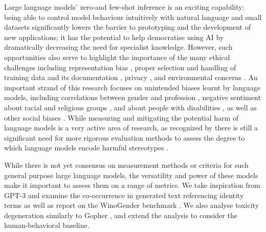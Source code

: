 Large language models' zero-and few-shot inference is an exciting capability: being able to control model behaviour intuitively with natural language and small datasets significantly lowers the barrier to prototyping and the development of new applications; it has the potential to help democratise using AI by dramatically decreasing the need for specialist knowledge. However, such opportunities also serve to highlight the importance of the many ethical challenges \cite{leidner-plachouras-2017-ethical,bender2021on,bommasani2021opportunities} including representation bias \cite{blodgett-etal-2020-language}, proper selection and handling of training data \cite{rogers-2021-changing} and its documentation \cite{bender-friedman-2018-data}, privacy \cite{privacy2016,carlini2021extracting}, and environmental concerns \cite{strubell-etal-2019-energy,patterson2021carbon}. An important strand of this research focuses on unintended biases learnt by language models, including correlations between gender and profession \citep{bolukbasi2016man,rudinger2018gender,zhao-etal-2018-gender}, negative sentiment about racial and religious groups \cite{li2020unqovering, nadeem2020stereoset}, and about people with disabilities \citep{hutchinson2020social}, as well as other social biases \citep{caliskan2017,rudinger-etal-2017-social,sap-etal-2020-social,sotnikova2021analyzing}. While measuring and mitigating the potential harm of language models is a very active area of research, as recognized by \citet{blodgett2021stereotyping,jacobs2021measuring} there is still a significant need for more rigorous evaluation methods to assess the degree to which language models encode harmful stereotypes \citep{may-etal-2019-measuring,webster2021measuring}.

While there is not yet consensus on measurement methods or criteria for such general purpose large language models, the versatility and power of these models make it important to assess them on a range of metrics. We take inspiration from GPT-3 \citep{NEURIPS2020_gpt3} and examine the co-occurrence in generated text referencing identity terms as well as report on the WinoGender benchmark \citep{rudinger2018gender}. We also analyse toxicity degeneration similarly to Gopher \citep{gopher2021}, and extend the analysis to consider the human-behavioral baseline. 

